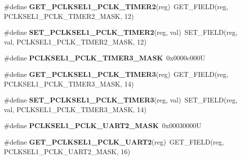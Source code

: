 \begin{DoxyCompactItemize}
\item 
\mbox{\label{group__lpc24xx__regs_ga19f997b48c368ddb1481f329525f8574}} 
\#define {\bfseries G\+E\+T\+\_\+\+P\+C\+L\+K\+S\+E\+L1\+\_\+\+P\+C\+L\+K\+\_\+\+T\+I\+M\+E\+R2}(reg)~G\+E\+T\+\_\+\+F\+I\+E\+LD(reg, P\+C\+L\+K\+S\+E\+L1\+\_\+\+P\+C\+L\+K\+\_\+\+T\+I\+M\+E\+R2\+\_\+\+M\+A\+SK, 12)
\item 
\mbox{\label{group__lpc24xx__regs_ga5086608001f270cefb601e5be1ffc97a}} 
\#define {\bfseries S\+E\+T\+\_\+\+P\+C\+L\+K\+S\+E\+L1\+\_\+\+P\+C\+L\+K\+\_\+\+T\+I\+M\+E\+R2}(reg,  val)~S\+E\+T\+\_\+\+F\+I\+E\+LD(reg, val, P\+C\+L\+K\+S\+E\+L1\+\_\+\+P\+C\+L\+K\+\_\+\+T\+I\+M\+E\+R2\+\_\+\+M\+A\+SK, 12)
\item 
\mbox{\label{group__lpc24xx__regs_ga63541f45d77ea0a06ef4674600b80224}} 
\#define {\bfseries P\+C\+L\+K\+S\+E\+L1\+\_\+\+P\+C\+L\+K\+\_\+\+T\+I\+M\+E\+R3\+\_\+\+M\+A\+SK}~0x0000c000U
\item 
\mbox{\label{group__lpc24xx__regs_ga9a88d6ac3dad787438b940119bbae013}} 
\#define {\bfseries G\+E\+T\+\_\+\+P\+C\+L\+K\+S\+E\+L1\+\_\+\+P\+C\+L\+K\+\_\+\+T\+I\+M\+E\+R3}(reg)~G\+E\+T\+\_\+\+F\+I\+E\+LD(reg, P\+C\+L\+K\+S\+E\+L1\+\_\+\+P\+C\+L\+K\+\_\+\+T\+I\+M\+E\+R3\+\_\+\+M\+A\+SK, 14)
\item 
\mbox{\label{group__lpc24xx__regs_ga981b4a64282426f30a2bc972a0f8930d}} 
\#define {\bfseries S\+E\+T\+\_\+\+P\+C\+L\+K\+S\+E\+L1\+\_\+\+P\+C\+L\+K\+\_\+\+T\+I\+M\+E\+R3}(reg,  val)~S\+E\+T\+\_\+\+F\+I\+E\+LD(reg, val, P\+C\+L\+K\+S\+E\+L1\+\_\+\+P\+C\+L\+K\+\_\+\+T\+I\+M\+E\+R3\+\_\+\+M\+A\+SK, 14)
\item 
\mbox{\label{group__lpc24xx__regs_ga81caf04524a142e4890567029662e828}} 
\#define {\bfseries P\+C\+L\+K\+S\+E\+L1\+\_\+\+P\+C\+L\+K\+\_\+\+U\+A\+R\+T2\+\_\+\+M\+A\+SK}~0x00030000U
\item 
\mbox{\label{group__lpc24xx__regs_ga23abc0ebf2620a87138a5c4156480e2f}} 
\#define {\bfseries G\+E\+T\+\_\+\+P\+C\+L\+K\+S\+E\+L1\+\_\+\+P\+C\+L\+K\+\_\+\+U\+A\+R\+T2}(reg)~G\+E\+T\+\_\+\+F\+I\+E\+LD(reg, P\+C\+L\+K\+S\+E\+L1\+\_\+\+P\+C\+L\+K\+\_\+\+U\+A\+R\+T2\+\_\+\+M\+A\+SK, 16)

\end{DoxyCompactItemize}
